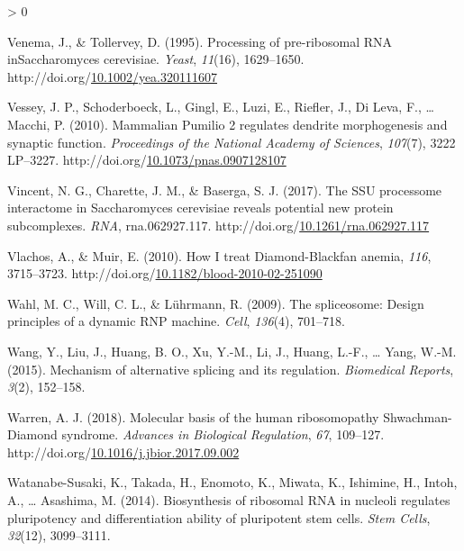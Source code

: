\documentclass[12pt,oneside]{reedthesis}
\newlength{\cslhangindent}
\newenvironment{CSLReferences}[2] %
 {%
  \setlength{\parindent}{0pt}
  \ifodd #1 \everypar{\setlength{\hangindent}{\cslhangindent}}\ignorespaces\fi
  \ifnum #2 > 0
  \setlength{\parskip}{#2\baselineskip}
  \fi
 }%
 {}
\begin{document}
\begin{CSLReferences}{1}{0}
\leavevmode\hypertarget{ref-venemaProcessingPreribosomalRNA1995}{}%
Venema, J., \& Tollervey, D. (1995). Processing of pre-ribosomal {RNA inSaccharomyces} cerevisiae. \emph{Yeast}, \emph{11}(16), 1629--1650. http://doi.org/\href{https://doi.org/10.1002/yea.320111607}{10.1002/yea.320111607}

\leavevmode\hypertarget{ref-Vessey2010b}{}%
Vessey, J. P., Schoderboeck, L., Gingl, E., Luzi, E., Riefler, J., Di Leva, F., \ldots{} Macchi, P. (2010). Mammalian {Pumilio} 2 regulates dendrite morphogenesis and synaptic function. \emph{Proceedings of the National Academy of Sciences}, \emph{107}(7), 3222 LP--3227. http://doi.org/\href{https://doi.org/10.1073/pnas.0907128107}{10.1073/pnas.0907128107}

\leavevmode\hypertarget{ref-vincentSSUProcessomeInteractome2017}{}%
Vincent, N. G., Charette, J. M., \& Baserga, S. J. (2017). The {SSU} processome interactome in {Saccharomyces} cerevisiae reveals potential new protein subcomplexes. \emph{RNA}, rna.062927.117. http://doi.org/\href{https://doi.org/10.1261/rna.062927.117}{10.1261/rna.062927.117}

\leavevmode\hypertarget{ref-Vlachos2010a}{}%
Vlachos, A., \& Muir, E. (2010). How {I} treat {Diamond}-{Blackfan} anemia, \emph{116}, 3715--3723. http://doi.org/\href{https://doi.org/10.1182/blood-2010-02-251090}{10.1182/blood-2010-02-251090}

\leavevmode\hypertarget{ref-Wahl2009}{}%
Wahl, M. C., Will, C. L., \& Lührmann, R. (2009). The spliceosome: Design principles of a dynamic {RNP} machine. \emph{Cell}, \emph{136}(4), 701--718.

\leavevmode\hypertarget{ref-Wang2015a}{}%
Wang, Y., Liu, J., Huang, B. O., Xu, Y.-M., Li, J., Huang, L.-F., \ldots{} Yang, W.-M. (2015). Mechanism of alternative splicing and its regulation. \emph{Biomedical Reports}, \emph{3}(2), 152--158.

\leavevmode\hypertarget{ref-warrenMolecularBasisHuman2018}{}%
Warren, A. J. (2018). Molecular basis of the human ribosomopathy {Shwachman}-{Diamond} syndrome. \emph{Advances in Biological Regulation}, \emph{67}, 109--127. http://doi.org/\href{https://doi.org/10.1016/j.jbior.2017.09.002}{10.1016/j.jbior.2017.09.002}

\leavevmode\hypertarget{ref-WatanabeSusaki2014a}{}%
Watanabe-Susaki, K., Takada, H., Enomoto, K., Miwata, K., Ishimine, H., Intoh, A., \ldots{} Asashima, M. (2014). Biosynthesis of ribosomal {RNA} in nucleoli regulates pluripotency and differentiation ability of pluripotent stem cells. \emph{Stem Cells}, \emph{32}(12), 3099--3111.


\end{CSLReferences}
\end{document}
